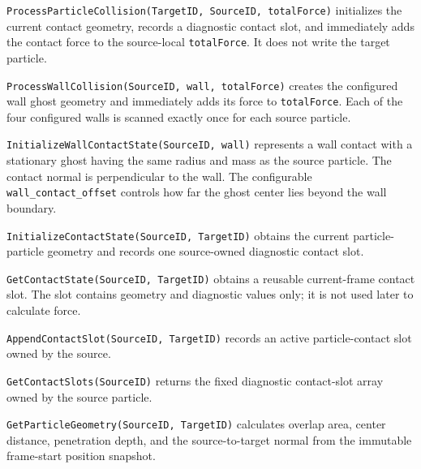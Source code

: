 
\texttt{ProcessParticleCollision(TargetID, SourceID, totalForce)} initializes
the current contact geometry, records a diagnostic contact slot, and
immediately adds the contact force to the source-local \texttt{totalForce}.
It does not write the target particle.


\texttt{ProcessWallCollision(SourceID, wall, totalForce)} creates the
configured wall ghost geometry and immediately adds its force to
\texttt{totalForce}.  Each of the four configured walls is scanned exactly
once for each source particle.


\texttt{InitializeWallContactState(SourceID, wall)} represents a wall contact
with a stationary ghost having the same radius and mass as the source
particle.  The contact normal is perpendicular to the wall.  The configurable
\texttt{wall\_contact\_offset} controls how far the ghost center lies beyond
the wall boundary.


\texttt{InitializeContactState(SourceID, TargetID)} obtains the current
particle-particle geometry and records one source-owned diagnostic contact
slot.


\texttt{GetContactState(SourceID, TargetID)} obtains a reusable current-frame
contact slot.  The slot contains geometry and diagnostic values only; it is
not used later to calculate force.


\texttt{AppendContactSlot(SourceID, TargetID)} records an active
particle-contact slot owned by the source.


\texttt{GetContactSlots(SourceID)} returns the fixed diagnostic contact-slot
array owned by the source particle.


\texttt{GetParticleGeometry(SourceID, TargetID)} calculates overlap area,
center distance, penetration depth, and the source-to-target normal from the
immutable frame-start position snapshot.

